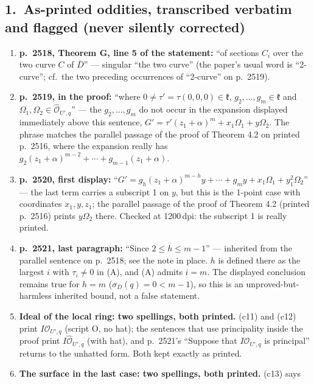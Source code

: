 \documentclass[11pt]{article}
\newcommand{\fk}{\mathfrak{k}}                 %
\newcommand{\OO}{\mathcal{O}}                  %
\newcommand{\OH}{\widehat{\mathcal{O}}}        %
\newcommand{\Dbar}{\overline{D}}               %
\begin{document}
\subsection*{1.\ As-printed oddities, transcribed verbatim and flagged (never silently corrected)}
\begin{enumerate}\itemsep0.25em
\item \textbf{p.\ 2518, Theorem G, line 5 of the statement:} ``of sections $C_i$ over the
      two curve $C$ of $\Dbar$'' --- singular ``the two curve'' (the paper's usual word is
      ``2-curve''; cf.\ the two preceding occurrences of ``2-curve'' on p.\ 2519).
\item \textbf{p.\ 2519, in the proof:} ``where $0 \neq \tau' = \tau(0,0,0) \in \fk$,
      $g_2, \dots, g_m \in \fk$ and $\Omega_1, \Omega_2 \in \OH_{U',q}$'' --- the
      $g_2, \dots, g_m$ do not occur in the expansion displayed immediately above this
      sentence, $G' = \tau'(z_1+\alpha)^m + x_1\Omega_1 + y\Omega_2$. The phrase matches
      the parallel passage of the proof of Theorem 4.2 on printed p.\ 2516, where the
      expansion really has $g_2(z_1+\alpha)^{m-2} + \cdots + g_{m-1}(z_1+\alpha)$.
\item \textbf{p.\ 2520, first display:} ``$G' = g_h(z_1+\alpha)^{m-h}y + \cdots + g_m y +
      x_1\Omega_1 + y_1^2\Omega_2$'' --- the last term carries a subscript 1 on $y$, but
      this is the 1-point case with coordinates $x_1, y, z_1$; the parallel passage of the
      proof of Theorem 4.2 (printed p.\ 2516) prints $y\Omega_2$ there. Checked at
      1200\,dpi: the subscript 1 is really printed.
\item \textbf{p.\ 2521, last paragraph:} ``Since $2 \leqslant h \leqslant m-1$'' ---
      inherited from the parallel sentence on p.\ 2518; see the note in place. $h$ is
      defined there as the largest $i$ with $\tau_i \neq 0$ in (A), and (A) admits $i = m$.
      The displayed conclusion remains true for $h = m$ ($\sigma_D(q) = 0 < m-1$), so this
      is an unproved-but-harmless inherited bound, not a false statement.
\item \textbf{Ideal of the local ring: two spellings, both printed.} (c11) and (c12)
      print $I\OO_{U',q}$ (script O, no hat); the sentences that use principality inside
      the proof print $I\OH_{U',q}$ (with hat), and p.\ 2521's ``Suppose that
      $I\OO_{U',q}$ is principal'' returns to the unhatted form. Both kept exactly as
      printed.
\item \textbf{The surface in the last case: two spellings, both printed.} (c13) says

\end{enumerate}
\end{document}

